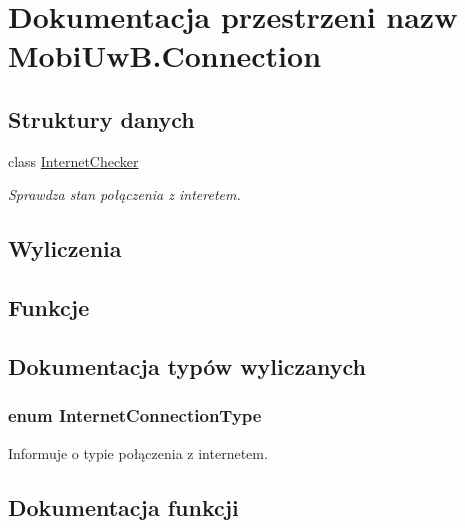 \hypertarget{a00266}{}\section{Dokumentacja przestrzeni nazw Mobi\+Uw\+B.\+Connection}
\label{a00266}
\subsection*{Struktury danych}
\begin{DoxyCompactItemize}
\item 
class \hyperlink{a00026}{Internet\+Checker}
\begin{DoxyCompactList}\small\item\em Sprawdza stan połączenia z interetem. \end{DoxyCompactList}\end{DoxyCompactItemize}
\subsection*{Wyliczenia}
\subsection*{Funkcje}


\subsection{Dokumentacja typów wyliczanych}
\hypertarget{a00266_aec3175500b16e238a3d923b6b442ee3e}{}
\subsubsection[{Internet\+Connection\+Type}]{\setlength{\rightskip}{0pt plus 5cm}enum Internet\+Connection\+Type\hspace{0.3cm}{\ttfamily [strong]}}\label{a00266_aec3175500b16e238a3d923b6b442ee3e}


Informuje o typie połączenia z internetem. 



\subsection{Dokumentacja funkcji}
\hypertarget{a00266_ad243fdf64e718fcf468694420f32105b}{}
